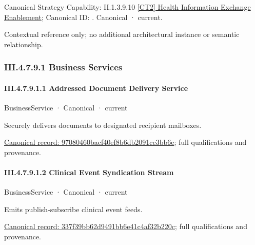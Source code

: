 {\small Canonical Strategy Capability: II.1.3.9.10 \hyperref[element:a61a15908ed544e6acf3e9cab63a0267]{[CT2] Health Information Exchange Enablement}; Canonical ID: \texttt{}. Canonical · current.}\par
Contextual reference only; no additional architectural instance or semantic relationship.\par
\subsubsection*{III.4.7.9.1 Business Services}
\label{navigation:III.4.7.9.1}

\paragraph*{III.4.7.9.1.1 Addressed Document Delivery Service}
\label{navigation:III.4.7.9.1.1}

\label{element:97080460bacf40ef8b6db2091cc3bb6e}
{\small BusinessService · Canonical · current}\par

Securely delivers documents to designated recipient mailboxes.


{\footnotesize \href{../../../../../../../continuum/business/business-service/97080460bacf40ef8b6db2091cc3bb6e.md}{Canonical record: 97080460bacf40ef8b6db2091cc3bb6e}; full qualifications and provenance.}\par
\paragraph*{III.4.7.9.1.2 Clinical Event Syndication Stream}
\label{navigation:III.4.7.9.1.2}

\label{element:337f39bb62d9491bb6e41c4af32b220c}
{\small BusinessService · Canonical · current}\par

Emits publish-subscribe clinical event feeds.


{\footnotesize \href{../../../../../../../continuum/business/business-service/337f39bb62d9491bb6e41c4af32b220c.md}{Canonical record: 337f39bb62d9491bb6e41c4af32b220c}; full qualifications and provenance.}\par
